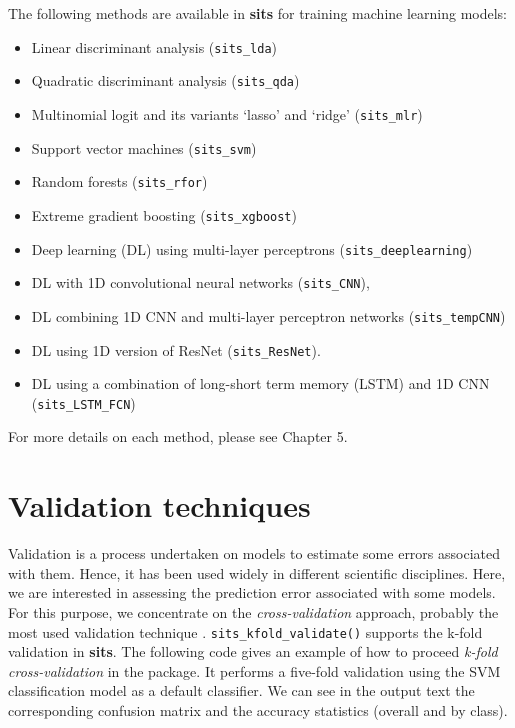 \documentclass[a4paper,]{tufte-book}
\providecommand{\tightlist}{%
  \setlength{\itemsep}{0pt}\setlength{\parskip}{0pt}}
\begin{document}
The following methods are available in \textbf{sits} for training machine learning models:

\begin{itemize}
\tightlist
\item
  Linear discriminant analysis (\texttt{sits\_lda})
\item
  Quadratic discriminant analysis (\texttt{sits\_qda})
\item
  Multinomial logit and its variants `lasso' and `ridge' (\texttt{sits\_mlr})
\item
  Support vector machines (\texttt{sits\_svm})
\item
  Random forests (\texttt{sits\_rfor})
\item
  Extreme gradient boosting (\texttt{sits\_xgboost})
\item
  Deep learning (DL) using multi-layer perceptrons (\texttt{sits\_deeplearning})
\item
  DL with 1D convolutional neural networks (\texttt{sits\_CNN}),
\item
  DL combining 1D CNN and multi-layer perceptron networks (\texttt{sits\_tempCNN})
\item
  DL using 1D version of ResNet (\texttt{sits\_ResNet}).
\item
  DL using a combination of long-short term memory (LSTM) and 1D CNN (\texttt{sits\_LSTM\_FCN})
\end{itemize}

For more details on each method, please see Chapter 5.

\hypertarget{validation-techniques}{%
\section{Validation techniques}\label{validation-techniques}}

Validation is a process undertaken on models to estimate some errors associated with them. Hence, it has been used widely in different scientific disciplines. Here, we are interested in assessing the prediction error associated with some models. For this purpose, we concentrate on the \emph{cross-validation} approach, probably the most used validation technique \citep{Hastie2009}. \texttt{sits\_kfold\_validate()} supports the k-fold validation in \textbf{sits}. The following code gives an example of how to proceed \emph{k-fold cross-validation} in the package. It performs a five-fold validation using the SVM classification model as a default classifier. We can see in the output text the corresponding confusion matrix and the accuracy statistics (overall and by class).
\end{document}
